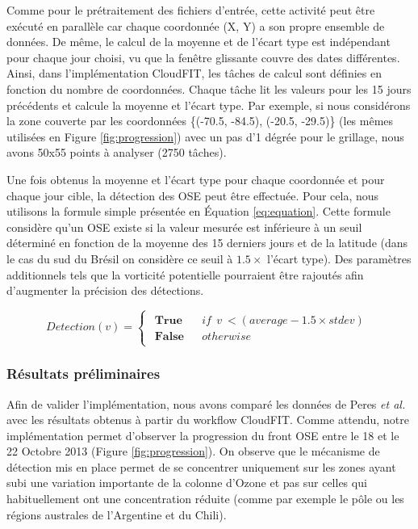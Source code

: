 Comme pour le prétraitement des fichiers d'entrée, cette activité peut être exécuté en parallèle car chaque coordonnée (X, Y) a son propre ensemble de données. De même, le calcul de la moyenne et de l'écart type est indépendant pour chaque jour choisi, vu que la fenêtre glissante couvre des dates différentes. Ainsi, dans l'implémentation CloudFIT, les tâches de calcul sont définies en fonction du nombre de coordonnées. Chaque tâche lit les valeurs pour les 15 jours précédents et calcule la moyenne et l'écart type. Par exemple, si nous considérons la zone couverte par les coordonnées \{(-70.5, -84.5), (-20.5, -29.5)\} (les mêmes utilisées en Figure \ref{fig:progression}) avec un pas d'1 dégrée pour le grillage, nous avons 50x55 points à analyser (2750 tâches). 

Une fois obtenus la moyenne et l'écart type pour chaque coordonnée et pour chaque jour cible, la détection des OSE peut être effectuée.  Pour cela, nous utilisons la formule simple présentée en Équation \ref{eq:equation}. Cette formule considère qu'un OSE existe si la valeur mesurée est inférieure à un seuil déterminé en fonction de la moyenne des 15 derniers jours et de la latitude (dans le cas du sud du Brésil on considère ce seuil à $1.5 \times$ l'écart type). Des paramètres additionnels tels que la vorticité potentielle pourraient être rajoutés afin d'augmenter la précision des détections.

\begin{equation}
Detection(v)=\left\{ \begin{array}{c}
\begin{array}{lll}
\textbf{True} & &if \:\: v \:< (average - 1.5\times stdev)\\
\textbf{False} & &otherwise\end{array}\end{array}\right.
\label{eq:equation}
\end{equation}



\subsubsection{Résultats préliminaires}

Afin de valider l'implémentation, nous avons comparé les données de Peres \textit{et al.} \cite{Peres2013} avec les résultats obtenus à partir du workflow CloudFIT. Comme attendu, notre implémentation permet d'observer la progression du front OSE entre le 18 et le 22 Octobre 2013 (Figure \ref{fig:progression}). On observe que le mécanisme de détection mis en place permet de se concentrer uniquement sur les zones ayant subi une variation importante de la colonne d'Ozone et pas sur celles qui habituellement ont une concentration réduite (comme par exemple le pôle ou les régions australes de l'Argentine et du Chili). 


